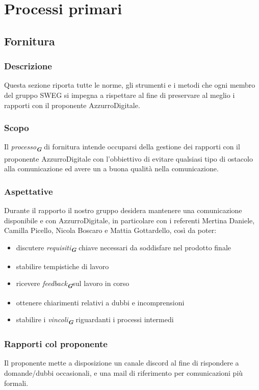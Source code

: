 

\section{Processi primari}
\label{sec:processi_primari}

\subsection{Fornitura}
\subsubsection{Descrizione}
Questa sezione riporta tutte le norme, gli strumenti e i metodi che ogni membro del gruppo SWEG si impegna a rispettare al fine di preservare al meglio i rapporti con il proponente AzzurroDigitale.
\subsubsection{Scopo}
Il \emph{processo}\textsubscript{\textit{\textbf{G}}} di fornitura intende occuparsi della gestione dei rapporti con il proponente AzzurroDigitale con l’obbiettivo di evitare qualsiasi tipo di ostacolo alla comunicazione ed avere un a buona qualità nella comunicazione.
\subsubsection{Aspettative}
Durante il rapporto il nostro gruppo desidera mantenere una comunicazione disponibile e con AzzurroDigitale, in particolare con i referenti Mertina Daniele, Camilla Picello, Nicola Boscaro e Mattia Gottardello, così da poter:
\begin{itemize}
\item discutere \emph{requisiti}\textsubscript{\textit{\textbf{G}}} chiave necessari da soddisfare nel prodotto finale
\item stabilire tempistiche di lavoro
\item ricevere \emph{feedback}\textsubscript{\textit{\textbf{G}}}sul lavoro in corso
\item ottenere chiarimenti relativi a dubbi e incomprensioni
\item stabilire i \emph{vincoli}\textsubscript{\textit{\textbf{G}}} riguardanti i processi intermedi
\end{itemize}
\subsubsection{Rapporti col proponente}
Il proponente mette a disposizione un canale discord al fine di rispondere a domande/dubbi occasionali, e una mail di riferimento per comunicazioni più formali.

